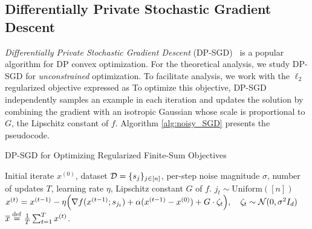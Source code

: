 \subsection{Differentially Private Stochastic Gradient Descent}
\emph{Differentially Private Stochastic Gradient Descent} (DP-SGD)~\citep{abadi2016deep,song2013stochastic} is a popular algorithm for DP convex optimization.
For the theoretical analysis, we study DP-SGD for \emph{unconstrained} optimization. 
To facilitate analysis, we work with the $\ell_{2}$ regularized objective expressed as 
To optimize this objective, DP-SGD independently samples an example in each iteration and updates the solution by combining the gradient with an isotropic Gaussian whose scale is proportional to $G$, the Lipschitz constant of $f$. 
Algorithm \ref{alg:noisy_SGD} presents the pseudocode.
\begin{algorithm}
\caption{DP-SGD for Optimizing Regularized Finite-Sum Objectives}
\label{alg:noisy_SGD}
\begin{algorithmic}[1]
 Initial iterate $x^{(0)}$, dataset $\mathcal D = \{s_j\}_{j \in [n]}$, per-step noise magnitude $\sigma$, number of updates $T$, learning rate $\eta$, Lipschitz constant $G$ of $f$.
    \State $j_t \sim \text{Uniform}([n])$
    \State $x^{(t)} = x^{(t-1)} - \eta\Big(\nabla f(x^{(t-1)};s_{j_t}) + \alpha(x^{(t-1)}-x^{(0)})+ G \cdot \zeta_t \Big), \quad \zeta_t \sim \mathcal N(0,\sigma^{2}I_d)$
\EndFor
\State \Return $\overline{x}\stackrel{{\mathrm{def}}}{=}\frac{1}{T}\sum_{t=1}^{T}x^{(t)}$.
\end{algorithmic}
\end{algorithm}


